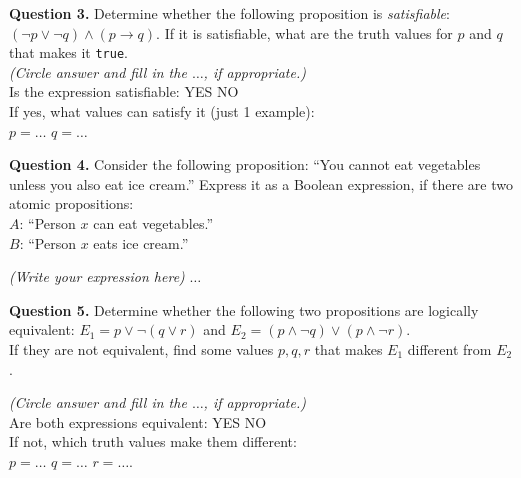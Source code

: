 \documentclass[jou]{apa6}
\begin{document}
\vspace{10pt}
{\bf Question 3.} Determine whether the following proposition is {\em satisfiable}:
$(\neg p \vee \neg q) \wedge (p \rightarrow q)$. If it is satisfiable, what are the 
truth values for $p$ and $q$ that makes it {\tt true}.\\


\vspace{3pt}
\noindent
{\em (Circle answer and fill in the $\ldots$, if appropriate.)}\\
Is the expression satisfiable: \hspace{5ex} YES \hspace{5ex} NO\\
If yes, what values can satisfy it (just 1 example):\\ 
$p = \ldots$ \hspace{5ex} $q = \ldots$ 



\vspace{10pt}
{\bf Question 4.}
Consider the following proposition: ``You cannot eat vegetables unless you also eat ice cream.''
Express it as a Boolean expression, if there are two atomic propositions:\\
$A$: ``Person $x$ can eat vegetables.''\\
$B$: ``Person $x$ eats ice cream.''

\vspace{3pt}
\noindent
{\em (Write your expression here)} $\ldots$


\vspace{10pt}
{\bf Question 5.} 
Determine whether the following two propositions are logically equivalent:
$E_1 =  p \vee \neg (q \vee r)$ and $E_2 = (p \wedge \neg q) \vee (p \wedge \neg r)$.\\
If they are not equivalent, find some values $p,q,r$ that makes $E_1$ different 
from $E_2$.



\vspace{3pt}
\noindent
{\em (Circle answer and fill in the $\ldots$, if appropriate.)}\\
Are both expressions equivalent: \hspace{5ex} YES \hspace{5ex} NO\\
If not, which truth values make them different:\\ 
$p = \ldots$ \hspace{5ex} $q = \ldots$ \hspace{5ex} $r = \ldots$. 
\end{document}
